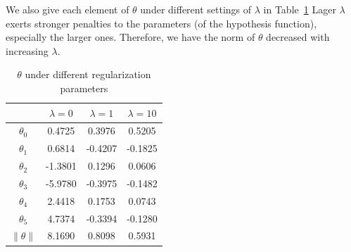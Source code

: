 \documentclass[10pt,a4paper]{article}
\begin{document}
  We also give each element of $\theta$ under different settings of $\lambda$ in Table~\ref{tab:theta} Lager $\lambda$ exerts stronger penalties to the parameters (of the hypothesis function), especially the larger ones. Therefore, we have the norm of $\theta$ decreased with increasing $\lambda$.


    \begin{table}[htb]
    \caption{$\theta$ under different regularization parameters}
    \begin{center}
     \begin{tabular}{|c|c|c|c|} \hline
                    & $\lambda=0$ & $\lambda=1$ & $\lambda=10$ \\ \hline
       $\theta_0$   & 0.4725 & 0.3976 & 0.5205 \\ \hline
       $\theta_1$   & 0.6814 & -0.4207 & -0.1825 \\ \hline
       $\theta_2$   & -1.3801 & 0.1296 & 0.0606 \\ \hline
       $\theta_3$   & -5.9780 & -0.3975 & -0.1482 \\ \hline
       $\theta_4$   & 2.4418 & 0.1753 & 0.0743 \\ \hline
       $\theta_5$   & 4.7374 & -0.3394 & -0.1280 \\ \hline
       $\|\theta\|$ & 8.1690 & 0.8098 & 0.5931 \\ \hline
     \end{tabular}
    \end{center}
    \label{tab:theta}
    \end{table}
\end{document}
